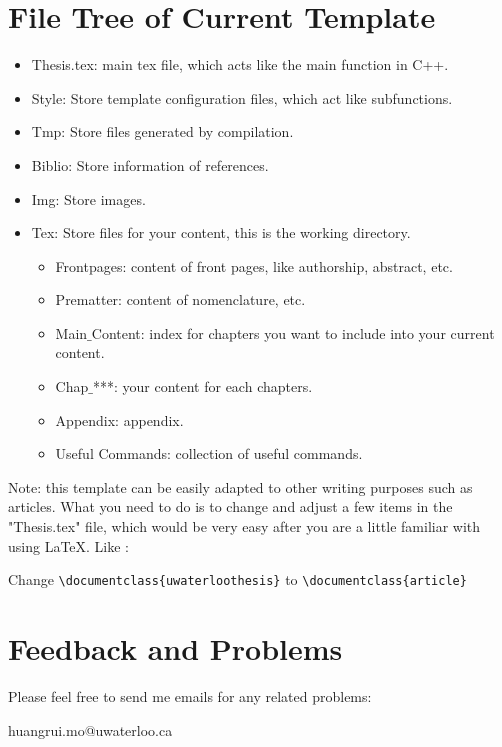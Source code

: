 \section{File Tree of Current Template}
\begin{itemize}
    \item Thesis.tex: main tex file, which acts like the main function in C++.
    \item Style: Store template configuration files, which act like subfunctions.
    \item Tmp: Store files generated by compilation.
    \item Biblio: Store information of references.
    \item Img: Store images.
    \item Tex: Store files for your content, this is the working directory.
        \begin{itemize}
            \item Frontpages: content of front pages, like authorship, abstract, etc.
            \item Prematter: content of nomenclature, etc.
            \item Main$\_$Content: index for chapters you want to include into your current content.
            \item Chap$\_$***: your content for each chapters.
            \item Appendix: appendix.
            \item Useful Commands: collection of useful commands.
        \end{itemize}
\end{itemize}

Note: this template can be easily adapted to other writing purposes such as articles. What you need to do is to change and adjust a few items in the "Thesis.tex" file, which would be very easy after you are a little familiar with using \LaTeX{}. Like :

Change \verb+\documentclass{uwaterloothesis}+ to \verb+\documentclass{article}+

\section{Feedback and Problems}
Please feel free to send me emails for any related problems:
\begin{center}
huangrui.mo@uwaterloo.ca
\end{center}
